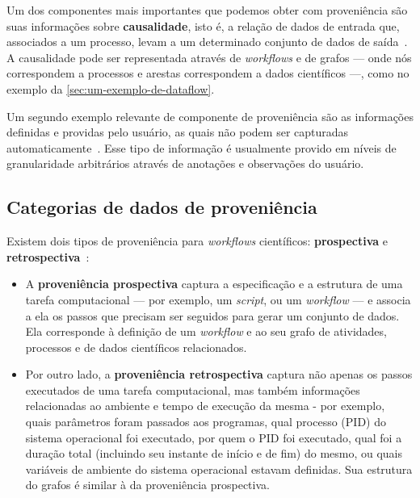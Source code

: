 Um dos componentes mais importantes que podemos obter com proveniência são suas informações sobre \textbf{causalidade}, isto é, a relação de dados de entrada que, associados a um processo, levam a um determinado conjunto de dados de saída~\cite{freire2008provenance}. A causalidade pode ser representada através de \textit{workflows} e de grafos --- onde nós correspondem a processos e arestas correspondem a dados científicos ---, como no exemplo da \autoref{sec:um-exemplo-de-dataflow}.

Um segundo exemplo relevante de componente de proveniência são as informações definidas e providas pelo usuário, as quais não podem ser capturadas automaticamente~\cite{freire2008provenance}.  Esse tipo de informação é usualmente provido em níveis de granularidade arbitrários através de anotações e observações do usuário.

\subsection{Categorias de dados de proveniência}

Existem dois tipos de proveniência para \textit{workflows} científicos: \textbf{prospectiva} e \textbf{retrospectiva}~\cite{murta2014noworkflow,freire2008provenance}:

\begin{itemize}
    \item A \textbf{proveniência prospectiva} captura a especificação e a estrutura de uma tarefa computacional --- por exemplo, um \textit{script}, ou um \textit{workflow} --- e associa a ela os passos que precisam ser seguidos para gerar um conjunto de dados. Ela corresponde à definição de um \textit{workflow} e ao seu grafo de atividades, processos e de dados científicos relacionados.
    \item Por outro lado, a \textbf{proveniência retrospectiva} captura não apenas os passos executados de uma tarefa computacional, mas também informações relacionadas ao ambiente e tempo de execução da mesma - por exemplo, quais parâmetros foram passados aos programas, qual  processo (PID) do sistema operacional foi executado, por quem o PID foi executado, qual foi a duração total (incluindo seu instante de início e de fim) do mesmo, ou quais variáveis de ambiente do sistema operacional estavam definidas. Sua estrutura do grafos é similar à da proveniência prospectiva.
\end{itemize}

